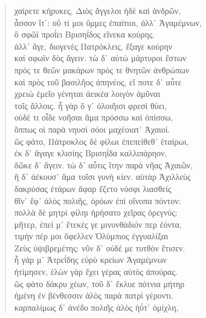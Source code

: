 \begin{Spacing}{1.5}
\begin{verse}
{\large\g χαίρετε κήρυκες, Διὸς ἄγγελοι ἠδὲ καὶ ἀνδρῶν,  } \\
{\large\g ἆσσον ἴτ᾽: οὔ τί μοι ὔμμες ἐπαίτιοι, ἀλλ᾽ Ἀγαμέμνων,  } \\
{\large\g ὃ σφῶϊ προΐει Βρισηΐδος εἵνεκα κούρης.  } \\
{\large\g ἀλλ᾽ ἄγε, διογενὲς Πατρόκλεις, ἔξαγε κούρην  } \\
{\large\g καί σφωϊν δὸς ἄγειν. τὼ δ᾽ αὐτὼ μάρτυροι ἔστων  } \\
{\large\g πρός τε θεῶν μακάρων πρός τε θνητῶν ἀνθρώπων  } \\
{\large\g καὶ πρὸς τοῦ βασιλῆος ἀπηνέος, εἴ ποτε δ᾽ αὖτε  } \\
{\large\g χρειὼ ἐμεῖο γένηται ἀεικέα λοιγὸν ἀμῦναι  } \\
{\large\g τοῖς ἄλλοις. ἦ γὰρ ὅ γ᾽ ὀλοιῆισι φρεσὶ θύει,  } \\
{\large\g οὐδέ τι οἶδε νοῆσαι ἅμα πρόσσω καὶ ὀπίσσω,  } \\
{\large\g ὅππως οἱ παρὰ νηυσὶ σόοι μαχέοιατ᾽ Ἀχαιοί.  } \\
{\large\g ὣς φάτο, Πάτροκλος δὲ φίλωι ἐπεπείθεθ᾽ ἑταίρωι,  } \\
{\large\g ἐκ δ᾽ ἄγαγε κλισίης Βρισηΐδα καλλιπάρηον,  } \\
{\large\g δῶκε δ᾽ ἄγειν. τὼ δ᾽ αὖτις ἴτην παρὰ νῆας Ἀχαιῶν,  } \\
{\large\g ἣ δ᾽ ἀέκουσ᾽ ἅμα τοῖσι γυνὴ κίεν. αὐτὰρ Ἀχιλλεὺς  } \\
{\large\g δακρύσας ἑτάρων ἄφαρ ἕζετο νόσφι λιασθείς  } \\
{\large\g θῖν᾽ ἔφ᾽ ἁλὸς πολιῆς, ὁρόων ἐπὶ οἴνοπα πόντον:  } \\
{\large\g πολλὰ δὲ μητρὶ φίληι ἠρήσατο χεῖρας ὀρεγνύς:  } \\
{\large\g μῆτερ, ἐπεί μ᾽ ἔτεκές γε μινυνθάδιόν περ ἐόντα,  } \\
{\large\g τιμήν πέρ μοι ὄφελλεν Ὀλύμπιος ἐγγυαλίξαι  } \\
{\large\g Ζεὺς ὑψιβρεμέτης: νῦν δ᾽ οὐδέ με τυτθὸν ἔτισεν.  } \\
{\large\g ἦ γάρ μ᾽ Ἀτρεΐδης εὐρὺ κρείων Ἀγαμέμνων  } \\
{\large\g ἠτίμησεν, ἑλὼν γὰρ ἔχει γέρας αὐτὸς ἀπούρας.  } \\
{\large\g ὣς φάτο δάκρυ χέων, τοῦ δ᾽ ἔκλυε πότνια μήτηρ  } \\
{\large\g ἡμένη ἐν βένθεσσιν ἁλὸς παρὰ πατρὶ γέροντι.  } \\
{\large\g καρπαλίμως δ᾽ ἀνέδυ πολιῆς ἁλὸς ἠΰτ᾽ ὀμίχλη,  } \\

\end{verse}
\end{Spacing}
